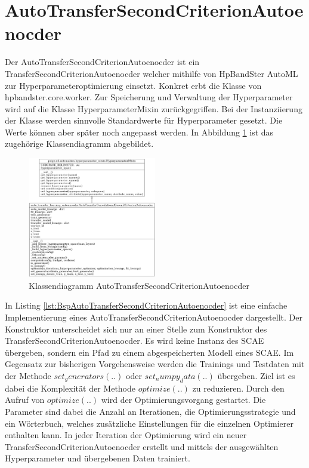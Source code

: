 	\section{AutoTransferSecondCriterionAutoenocder}
	\label{sec:AutoTransferSecondCriterionAutoenocder}
	Der AutoTransferSecondCriterionAutoenocder ist ein TransferSecondCriterionAutoenocder welcher mithilfe von HpBandSter AutoML zur Hyperparameteroptimierung einsetzt. Konkret  erbt die Klasse von hpbandster.core.worker. Zur Speicherung und Verwaltung der Hyperparameter wird auf die Klasse HyperparameterMixin zurückgegriffen. Bei der Instanziierung der Klasse werden sinnvolle Standardwerte für Hyperparameter gesetzt. Die Werte können aber später noch angepasst werden. 
	In Abbildung \ref{img:KlassendiagrammAutoTransferSecondCriterionAutoenocder}  ist das zugehörige Klassendiagramm abgebildet. 
	\begin{figure}[h]
		\centering
		\includegraphics[width=0.5\textwidth, center]{bilder/Klassendiagramme/Klassendiagramm_AutoTLCSCAE.png}
		\caption[Klassendiagramm AutoTransferSecondCriterionAutoenocder]{Klassendiagramm AutoTransferSecondCriterionAutoenocder}
		\label{img:KlassendiagrammAutoTransferSecondCriterionAutoenocder}
	\end{figure}  
	In Listing \ref{lst:BspAutoTransferSecondCriterionAutoenocder} ist eine einfache Implementierung eines AutoTransferSecondCriterionAutoenocder dargestellt. Der Konstruktor unterscheidet sich nur an einer Stelle zum Konstruktor des TransferSecondCriterionAutoenocder. Es wird keine Instanz des SCAE übergeben, sondern ein Pfad zu einem abgespeicherten Modell eines SCAE. 
	Im Gegensatz zur bisherigen Vorgehensweise werden die Trainings und Testdaten mit der Methode $set_generators(..)$  oder $set_numpy_data(..)$ übergeben. Ziel ist es dabei die Komplexität der Methode $optimize(..)$ zu reduzieren. Durch den Aufruf von $optimize(..)$ wird der Optimierungsvorgang gestartet. Die Parameter sind dabei die Anzahl an Iterationen, die Optimierungsstrategie und ein Wörterbuch, welches zusätzliche Einstellungen für die einzelnen Optimierer enthalten kann. In jeder Iteration der Optimierung wird ein neuer TransferSecondCriterionAutoenocder erstellt und mittels der ausgewählten Hyperparameter und übergebenen Daten trainiert. 
